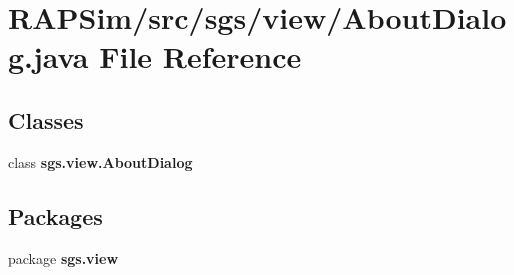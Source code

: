 \section{R\-A\-P\-Sim/src/sgs/view/\-About\-Dialog.java File Reference}
\label{_about_dialog_8java}
\subsection*{Classes}
\begin{DoxyCompactItemize}
\item 
class {\bf sgs.\-view.\-About\-Dialog}
\end{DoxyCompactItemize}
\subsection*{Packages}
\begin{DoxyCompactItemize}
\item 
package {\bf sgs.\-view}
\end{DoxyCompactItemize}
